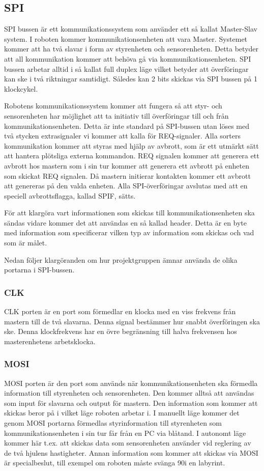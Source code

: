 \subsection{SPI}
SPI bussen är ett kommunikationssystem som använder ett så kallat Master-Slav system. I roboten kommer kommunikationsenheten att vara Master. Systemet kommer att ha två slavar i form av styrenheten och sensorenheten.
Detta betyder att all kommunikation kommer att behöva gå via kommunikationsenheten. SPI bussen arbetar alltid i så kallat full duplex läge vilket betyder att överföringar kan ske i två riktningar samtidigt. Således kan 2 bits skickas via SPI bussen på 1 klockcykel. 

Robotens kommunikationssystem kommer att fungera så att styr- och sensorenheten har möjlighet att ta initiativ till överföringar till och från kommunikationsenheten. Detta är inte standard på SPI-bussen utan löses med två stycken extrasignaler vi kommer att kalla för REQ-signaler. Alla sorters kommunikation kommer att styras med hjälp av avbrott, som är ett utmärkt sätt att hantera plötsliga externa kommandon. REQ signalen kommer att generera ett avbrott hos mastern som i sin tur kommer att generera ett avbrott på enheten som skickat REQ signalen. Då mastern initierar kontakten kommer ett avbrott att genereras på den valda enheten. Alla SPI-överföringar avslutas med att en speciell avbrottsflagga, kallad SPIF, sätts.

För att klargöra vart informationen som skickas till kommunikationsenheten ska sändas vidare kommer det att användas en så kallad header. Detta är en byte med information som specificerar vilken typ av information som skickas och vad som är målet. 

Nedan följer klargöranden om hur projektgruppen ämnar använda de olika portarna i SPI-bussen. 


\subsubsection{CLK}

CLK porten är en port som förmedlar en klocka med en viss frekvens från mastern till de två slavarna. Denna signal bestämmer hur snabbt överföringen ska ske. Denna klockfrekvens har en övre begränsning till halva frekvensen hos masterenhetens arbetsklocka.


\subsubsection{MOSI}
MOSI porten är den port som används när kommunikationsenheten ska förmedla
information till styrenheten och sensorenheten. Den kommer alltså att användas som
input för slavarna och output för mastern. Den information som kommer att
skickas beror på i vilket läge roboten arbetar i. I manuellt läge kommer det
genom MOSI portarna förmedlas styrinformation till styrenheten som
kommunikationsenheten i sin tur får från en PC via blåtand. I autonomt läge
kommer här t.ex. att skickas data som sensorenheten använder vid
reglering av de två hjulens hastigheter. Annan information som kommer att skickas via MOSI är
specialbeslut, till exempel om roboten måste svänga 90\degree i en labyrint.

